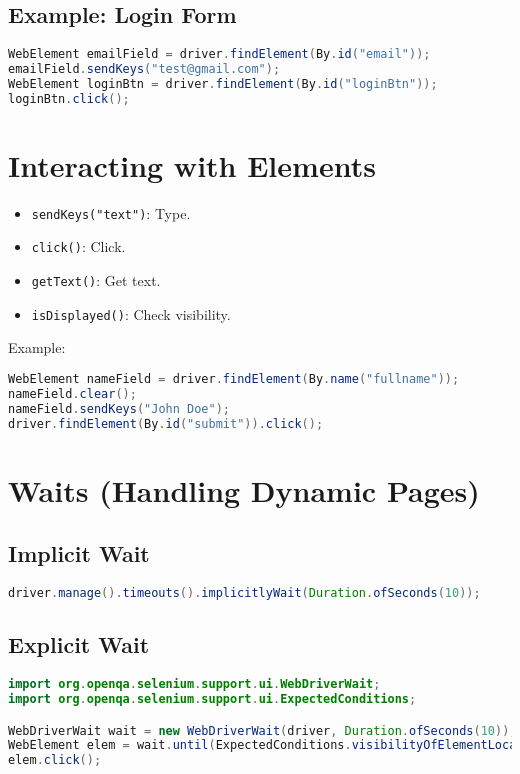\documentclass[a4paper,12pt]{article}
\begin{document}
\subsection{Example: Login Form}
\begin{lstlisting}[language=Java]
WebElement emailField = driver.findElement(By.id("email"));
emailField.sendKeys("test@gmail.com");
WebElement loginBtn = driver.findElement(By.id("loginBtn"));
loginBtn.click();
\end{lstlisting}

\section{Interacting with Elements}

\begin{itemize}
    \item \texttt{sendKeys("text")}: Type.
    \item \texttt{click()}: Click.
    \item \texttt{getText()}: Get text.
    \item \texttt{isDisplayed()}: Check visibility.
\end{itemize}

Example:
\begin{lstlisting}[language=Java]
WebElement nameField = driver.findElement(By.name("fullname"));
nameField.clear();
nameField.sendKeys("John Doe");
driver.findElement(By.id("submit")).click();
\end{lstlisting}

\section{Waits (Handling Dynamic Pages)}

\subsection{Implicit Wait}
\begin{lstlisting}[language=Java]
driver.manage().timeouts().implicitlyWait(Duration.ofSeconds(10));
\end{lstlisting}

\subsection{Explicit Wait}
\begin{lstlisting}[language=Java]
import org.openqa.selenium.support.ui.WebDriverWait;
import org.openqa.selenium.support.ui.ExpectedConditions;

WebDriverWait wait = new WebDriverWait(driver, Duration.ofSeconds(10));
WebElement elem = wait.until(ExpectedConditions.visibilityOfElementLocated(By.id("myButton")));
elem.click();
\end{lstlisting}
\end{document}
